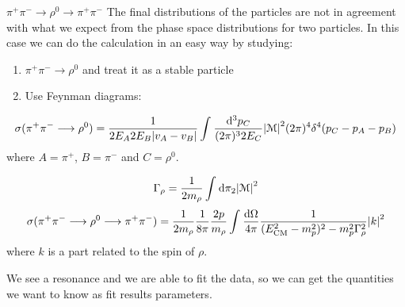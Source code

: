 \documentclass[../../main/main.tex]{subfiles}
\begin{document}
\begin{example}{\( \pi^+\pi^- \longrightarrow \rho^0 \longrightarrow \pi^+\pi^- \)}{}
    The final distributions of the particles are not in agreement with what we expect from the phase space distributions for two particles. In this case we can do the calculation in an easy way by studying:
    \begin{enumerate}
        \item \( \pi^+\pi^- \longrightarrow \rho^0 \) and treat it as a stable particle
        \item Use Feynman diagrams:
    \end{enumerate}

    \begin{equation}
        \sigma(\pi^+\pi^- \longrightarrow \rho^0)
        =
        \frac{1}{2 E_A 2 E_B \abs{v_A - v_B}} \int_{}^{} \frac{\mathrm{d}{^3p_C}}{(2\pi)^3 2 E_C} \abs{\mathcal{M}}^2 (2 \pi)^4 \delta^4(p_C - p_A - p_B)
        \label{eq:}
    \end{equation}
    where \( A = \pi^+ \), \( B = \pi^- \) and \( C = \rho^0 \).

    \begin{equation}
        \Gamma_{\rho}
        =
        \frac{1}{2 m_{\rho}} \int_{}^{} \mathrm{d}{\pi_2} \abs{\mathcal{M}}^2
        \label{eq:}
    \end{equation}
    \begin{equation}
        \sigma(\pi^+\pi^- \longrightarrow \rho^0 \longrightarrow \pi^+\pi^-)
        =
        \frac{1}{2m_{\rho}} \frac{1}{8\pi} \frac{2p}{m_{\rho}} \int_{}^{} \frac{\mathrm{d}{\Omega}}{4\pi} \frac{1}{(E^2_\mathrm{CM} - m^2_p)^2 - m^2_p \Gamma^2_{\rho}} \abs{k}^2
        \label{eq:}
    \end{equation}
    where \( k \) is a part related to the spin of \( \rho \).

    We see a resonance and we are able to fit the data, so we can get the quantities we want to know as fit results parameters.
\end{example}
\end{document}
